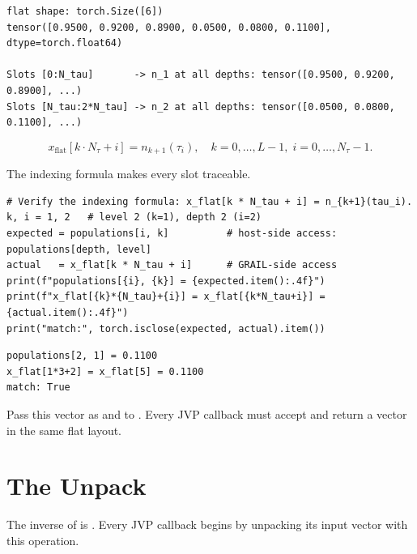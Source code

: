 \begin{lstlisting}[style=grailOutStyle]
flat shape: torch.Size([6])
tensor([0.9500, 0.9200, 0.8900, 0.0500, 0.0800, 0.1100], dtype=torch.float64)

Slots [0:N_tau]       -> n_1 at all depths: tensor([0.9500, 0.9200, 0.8900], ...)
Slots [N_tau:2*N_tau] -> n_2 at all depths: tensor([0.0500, 0.0800, 0.1100], ...)
\end{lstlisting}


\[
  x_\text{flat}[k \cdot N_\tau + i] = n_{k+1}(\tau_i),
  \quad k = 0, \ldots, L-1,\; i = 0, \ldots, N_\tau - 1.
\]

The indexing formula makes every slot traceable.

\begin{lstlisting}[style=grailInStyle]
# Verify the indexing formula: x_flat[k * N_tau + i] = n_{k+1}(tau_i).
k, i = 1, 2   # level 2 (k=1), depth 2 (i=2)
expected = populations[i, k]          # host-side access: populations[depth, level]
actual   = x_flat[k * N_tau + i]      # GRAIL-side access
print(f"populations[{i}, {k}] = {expected.item():.4f}")
print(f"x_flat[{k}*{N_tau}+{i}] = x_flat[{k*N_tau+i}] = {actual.item():.4f}")
print("match:", torch.isclose(expected, actual).item())
\end{lstlisting}

\begin{lstlisting}[style=grailOutStyle]
populations[2, 1] = 0.1100
x_flat[1*3+2] = x_flat[5] = 0.1100
match: True
\end{lstlisting}

Pass this vector as  and  to
.
Every JVP callback must accept and return a vector in the same flat layout.

\section{The Unpack}
\label{sec:unpack}

The inverse of  is
.
Every JVP callback begins by unpacking its input vector with this operation.

